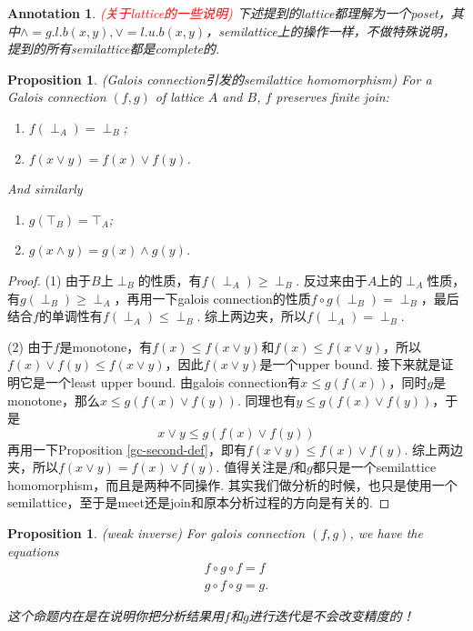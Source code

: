 \documentclass{article}
\newtheorem{proposition}[theorem]{Proposition}
\newtheorem{annotation}[theorem]{Annotation}
\newcommand{\redt}[1]{\textcolor{red}{#1}}
\begin{document}
\newpage

\begin{annotation}
\rm \redt{(关于lattice的一些说明)} 下述提到的lattice都理解为一个poset，其中$\wedge=g.l.b(x,y),\vee = l.u.b(x,y)$，semilattice上的操作一样，不做特殊说明，提到的所有semilattice都是complete的. 
\end{annotation}

\begin{proposition}
\rm {\color{red} (Galois connection引发的semilattice homomorphism)} For a Galois connection $(f,g)$ of lattice $A$ and $B$, $f$ preserves finite join:
\begin{enumerate}
	\item $f(\perp_A) = \perp_B$;
	\item $f(x \vee y) = f(x) \vee f(y)$.
\end{enumerate}
And similarly 
\begin{enumerate}
	\item $g(\top_B) = \top_A$;
	\item $g(x \wedge y) = g(x) \wedge g(y)$.
\end{enumerate} 
\end{proposition}

\begin{proof}
(1) 由于$B$上$\perp_B$的性质，有$f(\perp_A) \geq \perp_B$. 反过来由于$A$上的$\perp_A$性质，有$g(\perp_B) \geq \perp_A$，再用一下galois connection的性质$f\circ g(\perp_B) = \perp_B$，最后结合$f$的单调性有$f(\perp_A) \leq \perp_B$. 综上两边夹，所以$f(\perp_A) = \perp_B$.

(2) 由于$f$是monotone，有$f(x) \leq f(x \vee y)$和$f(x) \leq f(x \vee y)$，所以$f(x) \vee f(y) \leq f(x \vee y)$，因此$f(x \vee y)$是一个upper bound. 接下来就是证明它是一个least upper bound. 由galois connection有$x \leq g(f(x))$，同时$g$是monotone，那么$x \leq g(f(x) \vee f(y))$. 同理也有$y \leq g(f(x) \vee f(y))$，于是
$$
x \vee y \leq g(f(x) \vee f(y))
$$
再用一下Proposition \ref{gc-second-def}，即有$f(x \vee y) \leq f(x) \vee f(y)$. 综上两边夹，所以$f(x \vee y) = f(x) \vee f(y)$. {\color{red} 值得关注是$f$和$g$都只是一个semilattice homomorphism，而且是两种不同操作}. 其实我们做分析的时候，也只是使用一个semilattice，至于是meet还是join和原本分析过程的方向是有关的. 
\end{proof}

\begin{proposition}
\rm {\color{red} (weak inverse)} For galois connection $(f,g)$, we have the equations
$$
\begin{aligned}
f \circ g \circ f  = f \\
g \circ f \circ g = g.
\end{aligned}
$$

{\color{blue} 这个命题内在是在说明你把分析结果用$f$和$g$进行迭代是不会改变精度的！}
\end{proposition}
\end{document}
